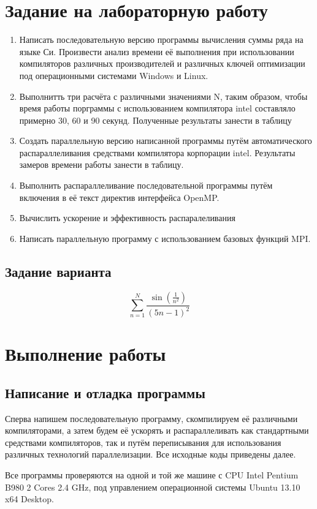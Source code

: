 \documentclass[a4paper,12pt]{article}
\begin{document}
\section{Задание на лабораторную работу}
\begin{enumerate}
 \item Написать последовательную версию программы вычисления суммы ряда на языке Си. Произвести анализ времени её выполнения при использовании компиляторов различных производителей и различных ключей оптимизации под операционными системами Windows и Linux.
 \item Выполнитть три расчёта с различными значениями N, таким образом, чтобы время работы порграммы с использованием компилятора intel составляло примерно 30, 60 и 90 секунд. Полученные результаты занести в таблицу
 \item Создать параллельную версию написанной программы путём автоматического распараллеливания средствами компилятора корпорации intel. Результаты замеров времени работы занести в таблицу.
 \item Выполнить распараллеливание последовательной программы путём включения в её текст директив интерфейса OpenMP.
 \item Вычислить ускорение и эффективность распаралеливания
 \item Написать параллельную программу с использованием базовых функций MPI.
\end{enumerate}
\subsection{Задание варианта}
$$\sum_{n=1}^N \frac{\sin(\frac{1}{n^2})}{(5n-1)^2}$$
\section{Выполнение работы}
\subsection{Написание и отладка программы}
Сперва напишем последовательную программу, скомпилируем её различными компиляторами, а затем будем её ускорять и распараллеливать как стандартными средствами компиляторов, так и путём переписывания для использования различных технологий параллелизации. Все исходные коды приведены далее.

Все программы проверяются на одной и той же машине с CPU Intel Pentium B980 2 Cores 2.4 GHz, под управлением операционной системы Ubuntu 13.10 x64 Desktop.
\end{document}
